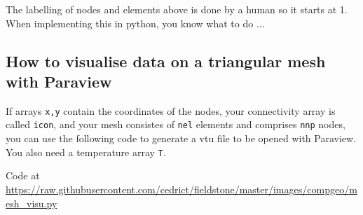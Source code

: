 The labelling of nodes and elements above is done by a human so it starts at 1. When 
implementing this in python, you know what to do ...


\subsection{How to visualise data on a triangular mesh with Paraview}

If arrays {\tt x,y} contain the coordinates of the nodes, your connectivity array is called {\tt icon},
and your mesh consistes of {\tt nel} elements and comprises {\tt nnp} nodes, you can use the following code
to generate a vtu file to be opened with Paraview. You also need a temperature array {\tt T}.

\begin{center}
Code at \url{https://raw.githubusercontent.com/cedrict/fieldstone/master/images/compgeo/mesh_visu.py}
\end{center}


